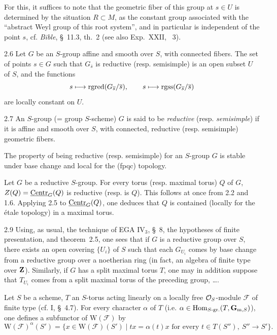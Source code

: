 For this, it suffices to note that the geometric fiber of this group at $s\in U$ is determined by the situation $R\subset M$, as the constant group associated with the ``abstract Weyl group of this root system'', and in particular is independent of the point $s$, cf. \textit{Bible}, \S~11.3, th.~2 (see also Exp.~XXII, \No~3).

\begin{corollary}{2.6}\label{XIX.2.6}
Let $G$ be an $S$-group affine and smooth over $S$, with connected fibers. The set of points $s\in G$ such that $G_{\overline{s}}$ is reductive (resp. semisimple) is an open subset $U$ of $S$, and the functions
\[
s\longmapsto\operatorname{rgred}(G_{\overline{s}}/\overline{s}),\qquad
s\longmapsto\operatorname{rgss}(G_{\overline{s}}/\overline{s})
\]
are locally constant on $U$.
\end{corollary}

\begin{definition}{2.7}\label{XIX.2.7}
An $S$-group (= group $S$-scheme) $G$ is said to be \emph{reductive} (resp. \emph{semisimple}) if it is affine and smooth over $S$, with connected, reductive (resp. semisimple) geometric fibers.
\end{definition}
The property of being reductive (resp. semisimple) for an $S$-group $G$ is stable under base change and local for the (fpqc) topology.

 Let $G$ be a reductive $S$-group. For every torus (resp. maximal torus) $Q$ of $G$, $Z(Q)=\underline{\mathrm{Centr}}_G(Q)$ is reductive (resp. is $Q$). This follows at once from 2.2 and 1.6. Applying 2.5 to $\underline{\mathrm{Centr}}_G(Q)$, one deduces that $Q$ is contained (locally for the \'etale topology) in a maximal torus.

\begin{remark}{2.9}\label{XIX.2.9}
Using, as usual, the technique of EGA IV$_3$, \S~8, the hypotheses of finite presentation, and theorem~2.5, one sees that if $G$ is a reductive group over $S$, there exists an open covering $\{U_i\}$ of $S$ such that each $G_{U_i}$ comes by base change from a reductive group over a noetherian ring (in fact, an algebra of finite type over $\mathbf{Z}$). Similarly, if $G$ has a split maximal torus $T$, one may in addition suppose that $T_{U_i}$ comes from a split maximal torus of the preceding group, \ldots.
\end{remark}

\label{XIX.sec.3}
 Let $S$ be a scheme, $T$ an $S$-torus acting linearly on a locally free $\mathcal{O}_S$-module $\mathcal F$ of finite type (cf. I, \S~4.7). For every character $\alpha$ of $T$ (i.e. $\alpha\in\operatorname{Hom}_{S\text{-gr.}}(T,\mathbf{G}_{\mathrm m,S})$), one defines a subfunctor of $\mathrm W(\mathcal F)$ by
\[
\mathrm W(\mathcal F)^\alpha(S')=
\{x\in\mathrm W(\mathcal F)(S')\mid tx=\alpha(t)x\text{ for every }t\in T(S''),\ S''\to S'\}.
\]

